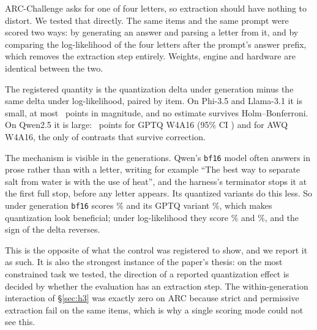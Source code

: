 \documentclass[11pt]{article}
\begin{document}
ARC-Challenge asks for one of four letters, so extraction should have nothing to distort.
We tested that directly. The same \hSixItems{} items and the same prompt were scored two
ways: by generating an answer and parsing a letter from it, and by comparing the
log-likelihood of the four letters after the prompt's answer prefix, which removes the
extraction step entirely. Weights, engine and hardware are identical between the two.

The registered quantity is the quantization delta under generation minus the same delta
under log-likelihood, paired by item. On Phi-3.5 and Llama-3.1 it is small, at most
\hSixMaxOther{}~points in magnitude, and no estimate survives Holm--Bonferroni.
On Qwen2.5 it is large: \hSixQwenGptq{}~points for GPTQ W4A16 (95\% CI \hSixQwenGptqCI{})
and \hSixQwenAwq{} for AWQ W4A16, the only \hSixRejected{} of \hSixM{} contrasts that
survive correction.

The mechanism is visible in the generations. Qwen's \texttt{bf16} model often answers
in prose rather than with a letter, writing for example ``The best way to separate salt
from water is with the use of heat'', and the harness's terminator stops it at the first
full stop, before any letter appears. Its quantized variants do this less. So under
generation \texttt{bf16} scores \hSixQwenBfGen\% and its GPTQ variant \hSixQwenGptqGen\%,
which makes quantization look beneficial; under log-likelihood they score
\hSixQwenBfLL\% and \hSixQwenGptqLL\%, and the sign of the delta reverses.

This is the opposite of what the control was registered to show, and we report it as
such. It is also the strongest instance of the paper's thesis: on the most constrained
task we tested, the direction of a reported quantization effect is decided by whether
the evaluation has an extraction step. The within-generation interaction of
\S\ref{sec:h3} was exactly zero on ARC because strict and permissive extraction fail on
the same items, which is why a single scoring mode could not see this.
\end{document}
